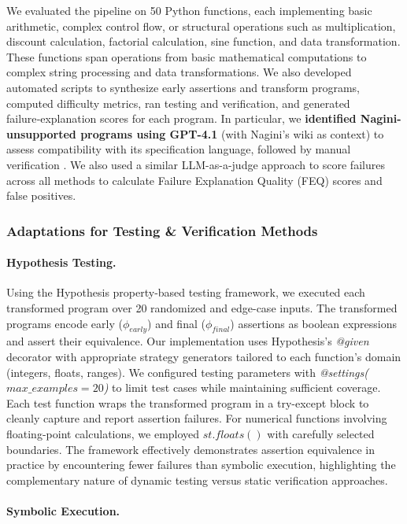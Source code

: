 \documentclass[8pt]{extarticle}
\begin{document}
We evaluated the pipeline on 50 Python functions, each implementing basic arithmetic, complex control flow, or structural operations such as multiplication, discount calculation, factorial calculation, sine function, and data transformation. These functions span operations from basic mathematical computations to complex string processing and data transformations. We also developed automated scripts to synthesize early assertions and transform programs, computed difficulty metrics, ran testing and verification, and generated failure‑explanation scores for each program. In particular, we \textbf{identified Nagini-unsupported programs using GPT-4.1} (with Nagini's wiki as context) to assess compatibility with its specification language, followed by manual verification \cite{eilers2018}. We also used a similar LLM-as-a-judge approach to score failures across all methods to calculate Failure Explanation Quality (FEQ) scores and false positives. 

\subsubsection{Adaptations for Testing \& Verification Methods}
\paragraph{Hypothesis Testing.} Using the Hypothesis property-based testing framework, we executed each transformed program over 20 randomized and edge-case inputs. The transformed programs encode early (\(\phi_{early}\)) and final (\(\phi_{final}\)) assertions as boolean expressions and assert their equivalence. Our implementation uses Hypothesis's \textit{@given} decorator with appropriate strategy generators tailored to each function's domain (integers, floats, ranges). We configured testing parameters with \textit{@settings($max\_examples=20$)} to limit test cases while maintaining sufficient coverage. Each test function wraps the transformed program in a try-except block to cleanly capture and report assertion failures. For numerical functions involving floating-point calculations, we employed $st.floats()$ with carefully selected boundaries. The framework effectively demonstrates assertion equivalence in practice by encountering fewer failures than symbolic execution, highlighting the complementary nature of dynamic testing versus static verification approaches.

\paragraph{Symbolic Execution.}  
\end{document}
